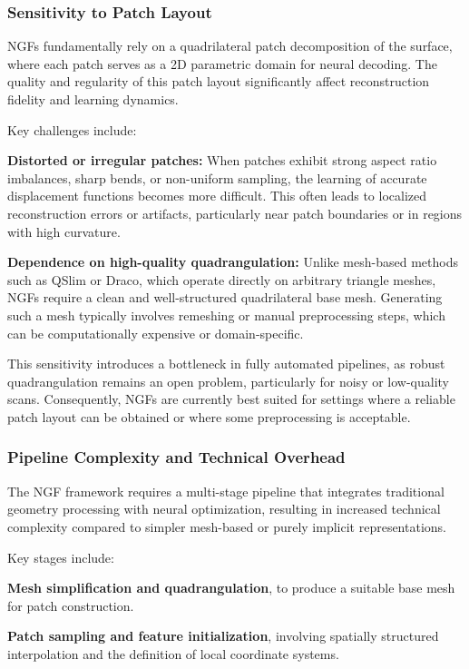 \subsubsection{Sensitivity to Patch Layout}

NGFs fundamentally rely on a quadrilateral patch decomposition of the surface, where each patch serves as a 2D parametric domain for neural decoding. 
The quality and regularity of this patch layout significantly affect reconstruction fidelity and learning dynamics. 

Key challenges include: 

\textbf{Distorted or irregular patches:} When patches exhibit strong aspect ratio imbalances, sharp bends, or non-uniform sampling, the learning of accurate displacement functions becomes more difficult. 
This often leads to localized reconstruction errors or artifacts, particularly near patch boundaries or in regions with high curvature. 

\textbf{Dependence on high-quality quadrangulation:} Unlike mesh-based methods such as QSlim or Draco, which operate directly on arbitrary triangle meshes, NGFs require a clean and well-structured quadrilateral base mesh. 
Generating such a mesh typically involves remeshing or manual preprocessing steps, which can be computationally expensive or domain-specific. 

This sensitivity introduces a bottleneck in fully automated pipelines, as robust quadrangulation remains an open problem, particularly for noisy or low-quality scans. 
Consequently, NGFs are currently best suited for settings where a reliable patch layout can be obtained or where some preprocessing is acceptable. 

\subsubsection{Pipeline Complexity and Technical Overhead}

The NGF framework requires a multi-stage pipeline that integrates traditional geometry processing with neural optimization, resulting in increased technical complexity compared to simpler mesh-based or purely implicit representations. 

Key stages include: 

\textbf{Mesh simplification and quadrangulation}, to produce a suitable base mesh for patch construction. 

\textbf{Patch sampling and feature initialization}, involving spatially structured interpolation and the definition of local coordinate systems. 


